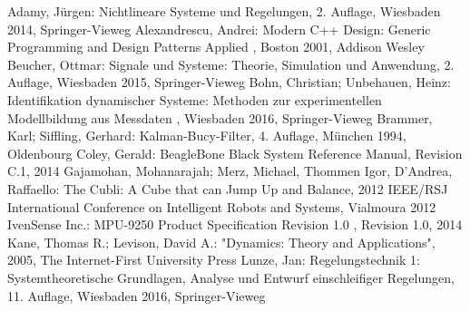 \begin{thebibliography}{999}%
 Adamy, Jürgen: \glqq Nichtlineare Systeme und Regelungen\grqq , 2. Auflage, Wiesbaden 2014, Springer-Vieweg
 Alexandrescu, Andrei: \glqq Modern C++ Design: Generic Programming and Design Patterns Applied \grqq, Boston 2001, Addison Wesley 
 Beucher, Ottmar: \glqq Signale und Systeme: Theorie, Simulation und Anwendung\grqq , 2. Auflage, Wiesbaden 2015, Springer-Vieweg
 Bohn, Christian; Unbehauen, Heinz: \glqq Identifikation dynamischer Systeme: Methoden zur experimentellen Modellbildung aus Messdaten \grqq , Wiesbaden 2016, Springer-Vieweg
 Brammer, Karl; Siffling, Gerhard: \glqq Kalman-Bucy-Filter\grqq, 4. Auflage, München 1994, Oldenbourg
Coley, Gerald: \glqq BeagleBone Black System Reference Manual\grqq , Revision C.1, 2014
 Gajamohan, Mohanarajah; Merz, Michael, Thommen Igor, D'Andrea, Raffaello: \glqq The Cubli: A Cube that can Jump Up and Balance\grqq , 2012 IEEE/RSJ International Conference on Intelligent Robots and Systems, Vialmoura 2012
 IvenSense Inc.: \glqq MPU-9250 Product Specification Revision 1.0 \grqq, Revision 1.0, 2014
 Kane, Thomas R.; Levison, David A.: "Dynamics: Theory and Applications", 2005, The Internet-First University Press
 Lunze, Jan: \grqq Regelungstechnik 1: Systemtheoretische Grundlagen, Analyse und Entwurf einschleifiger Regelungen\grqq , 11. Auflage, Wiesbaden 2016, Springer-Vieweg

\end{thebibliography}

